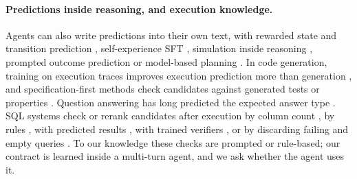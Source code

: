\paragraph{Predictions inside reasoning, and execution knowledge.}
Agents can also write predictions into their own text, with rewarded state and transition prediction \citep{wang2025vagen}, self-experience SFT \citep{chen2025spa}, simulation inside reasoning \citep{yu2025dynathink,yu2025dynamind}, prompted outcome prediction \citep{fu2024preact} or model-based planning \citep{gu2024webdreamer}. In code generation, training on execution traces improves execution prediction more than generation \citep{copet2025cwm,armengol2025et,ni2024next}, and specification-first methods check candidates against generated tests or properties \citep{chen2022codet,prasad2025utgen,lee2026solidcoder}. Question answering has long predicted the expected answer type \citep{li2002questionclassification}. SQL systems check or rerank candidates after execution by column count \citep{chen2023selfdebug}, by rules \citep{tian2026pvsql,gong2025sqlens}, with predicted results \citep{li2024selectsql}, with trained verifiers \citep{ni2023lever,pourreza2024chase}, or by discarding failing and empty queries \citep{wang2018egdecoding}. To our knowledge these checks are prompted or rule-based; our contract is learned inside a multi-turn agent, and we ask whether the agent uses it.
